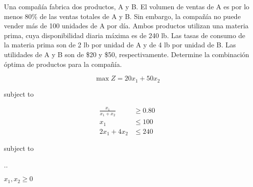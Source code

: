\question
\label{act:taha_02-02A-05}
  Una compañía fabrica dos productos, A y B. El volumen de ventas de A es por lo menos 80\% de las ventas totales de A y B. Sin embargo, la compañía no puede vender más de 100 unidades de A por día. Ambos productos utilizan una materia prima, cuya disponibilidad diaria máxima es de 240 lb. Las tasas de consumo de la materia prima son de 2 lb por unidad de A y de 4 lb por unidad de B. Las utilidades de A y B son de \$20 y \$50, respectivamente. Determine la combinación óptima de productos para la compañía.

  \begin{solution}
    
      \[ \max Z = 20x_1 + 50x_2 \]
      \begin{center}
        \begin{minipage}[t]{0.4\linewidth}
          subject to
          
        \begin{align*}
            \frac{x_1}{x_1 + x_2} &\geq 0.80\\[3mm]
          x_1  &\leq 100\\[3mm]
          2x_1 + 4x_2 &\leq 240
        \end{align*}
      \end{minipage}
      \begin{minipage}[t]{0.3\linewidth}
subject to

\vspace{3mm}

\sysdelim..
      \end{minipage}

$x_1, x_2 \geq 0$
      \end{center}
  \end{solution}

